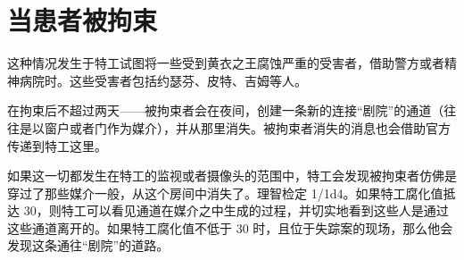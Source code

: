 \section{当患者被拘束}

这种情况发生于特工试图将一些受到黄衣之王腐蚀严重的受害者，借助警方或者精神病院时。这些受害者包括约瑟芬、皮特、吉姆等人。

在拘束后不超过两天——被拘束者会在夜间，创建一条新的连接“剧院”的通道（往往是以窗户或者门作为媒介），并从那里消失。被拘束者消失的消息也会借助官方传递到特工这里。

如果这一切都发生在特工的监视或者摄像头的范围中，特工会发现被拘束者仿佛是穿过了那些媒介一般，从这个房间中消失了。理智检定 1/1d4。如果特工腐化值抵达 30，则特工可以看见通道在媒介之中生成的过程，并切实地看到这些人是通过这些通道离开的。如果特工腐化值不低于 30 时，且位于失踪案的现场，那么他会发现这条通往“剧院”的道路。